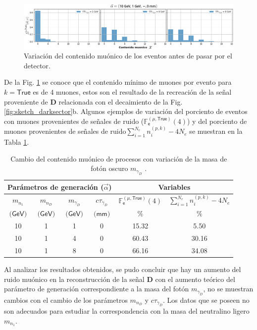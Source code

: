 \begin{figure}[!ht]
\centering
\includegraphics[width=1\textwidth]{Simulacion/imagenes/True_Entries.png}
\caption{Variación del contenido muónico de los eventos antes de pasar por el detector.}
\label{contenido_muonico}
\end{figure}

De la Fig. \ref{contenido_muonico} se conoce que el contenido mínimo de muones por evento para $k=\textsf{True}$ es de 4 muones, estos son el resultado de la recreación de la señal \MC ~ proveniente de \MSSM\textbf{D} relacionada con el decaimiento de la Fig. \ref{fig:sketch_darksector}b. Algunos ejemplos de variación del porciento de eventos con muones provenientes de señales de ruido ($\mathbb{F}^{(\mu, \textsf{True})}_\textsf{e}(4)$) y del porciento de muones provenientes de señales de ruido$\sum_{i=1}^{N_e} n_i^{(p,k)} - 4 N_e$ se muestran en la Tabla \ref{generacion0}.


\begin{table}[!h]
\centering
\begin{tabular}{|cccc|c|c|}
\toprule
\multicolumn{4}{|c|}{Parámetros de generación ($\vec{\alpha}$)} & \multicolumn{2}{|c|}{Variables} \\
\midrule
$m_{n_1}$ & 
$m_{n_D}$ & 
$m_{\gamma_D}$ & 
$c\tau_{\gamma_D}$ & 
$\mathbb{F}^{(\mu, \textsf{True})}_\textsf{e}(4)$ &
$\sum_{i=1}^{N_e} n_i^{(p,k)} - 4 N_e$ \\
$\textsf{(GeV)}$ & 
$\textsf{(GeV)}$ & 
$\textsf{(GeV)}$ & 
$\textsf{(mm)}$ & 
$\textsf{\%}$ & 
$\textsf{\%}$ \\
\midrule
10 & 1 & 1 & 0 & 15.32 & 5.50 \\
10 & 1 & 4 & 0 & 60.43 & 30.16\\
10 & 1 & 8 & 0 & 66.16 & 34.08\\
\bottomrule 
\end{tabular}%
\caption{Cambio del contenido muónico de procesos con variación de la masa de fotón oscuro $m_{\gamma_D}$ .}
\label{generacion0}
\end{table}
Al analizar los resultados obtenidos, se pudo concluir que hay un aumento del ruido muónico en la reconstrucción de la señal \MSSM\textbf{D} con el aumento teórico del parámetro de generación correspondiente a la masa del fotón $m_{\gamma_D}$, no se muestran cambios con el cambio de los parámetros $m_{n_D}$ y $c\tau_{\gamma_D}$. Los datos que se poseen no son adecuados para estudiar la correspondencia con la masa del neutralino ligero $m_{n_1}$.

